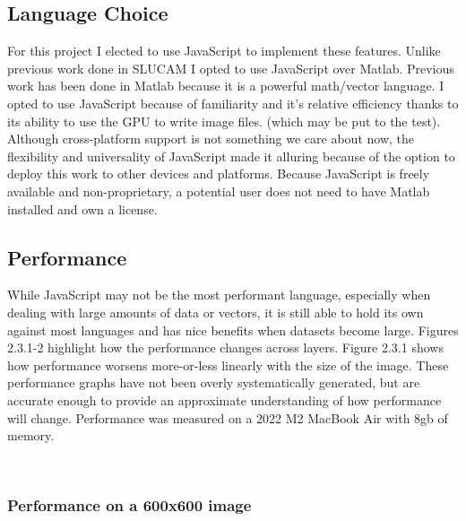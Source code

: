 \documentclass{article}
\begin{document}
\begin{multicols}{2}
\subsection{Language Choice}

For this project I elected to use JavaScript to implement these features. Unlike previous work done in SLUCAM I opted to use JavaScript over Matlab. Previous work has been done in Matlab because it is a powerful math/vector language. I opted to use JavaScript because of familiarity and it's relative efficiency thanks to its ability to use the GPU to write image files. (which may be put to the test). Although cross-platform support is not something we care about now, the flexibility and universality of JavaScript made it alluring because of the option to deploy this work to other devices and platforms. Because JavaScript is freely available and non-proprietary, a potential user does not need to have Matlab installed and own a license.

\subsection{Performance}

While JavaScript may not be the most performant language, especially when dealing with large amounts of data or vectors, it is still able to hold its own against most languages and has nice benefits when datasets become large. Figures 2.3.1-2 highlight how the performance changes across layers. Figure 2.3.1 shows how performance worsens more-or-less linearly with the size of the image. These performance graphs have not been overly systematically generated, but are accurate enough to provide an approximate understanding of how performance will change. Performance was measured on a 2022 M2 MacBook Air with 8gb of memory.

\

\subsubsection{Performance on a 600x600 image}

\sixhundred

\noindent
\resizebox{\columnwidth}{!}{

\begin{tikzpicture}


\end{tikzpicture}}
\end{multicols}
\end{document}
